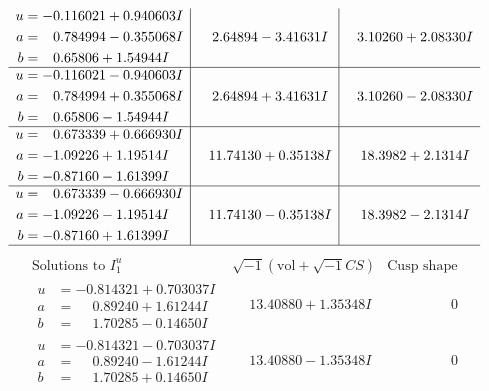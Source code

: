 \documentclass[1p]{elsarticle_modified}
\theoremstyle{definition}
\newcommand{\I}{\sqrt{-1}}
\begin{document}
$$\begin{array}{c|c|c}
\begin{aligned}
u &= -0.116021 + 0.940603 I \\
a &= \phantom{-}0.784994 - 0.355068 I \\
b &= \phantom{-}0.65806 + 1.54944 I\end{aligned}
 & \phantom{-}2.64894 - 3.41631 I & \phantom{-}3.10260 + 2.08330 I \\ \hline\begin{aligned}
u &= -0.116021 - 0.940603 I \\
a &= \phantom{-}0.784994 + 0.355068 I \\
b &= \phantom{-}0.65806 - 1.54944 I\end{aligned}
 & \phantom{-}2.64894 + 3.41631 I & \phantom{-}3.10260 - 2.08330 I \\ \hline\begin{aligned}
u &= \phantom{-}0.673339 + 0.666930 I \\
a &= -1.09226 + 1.19514 I \\
b &= -0.87160 - 1.61399 I\end{aligned}
 & \phantom{-}11.74130 + 0.35138 I & \phantom{-}18.3982 + 2.1314 I \\ \hline\begin{aligned}
u &= \phantom{-}0.673339 - 0.666930 I \\
a &= -1.09226 - 1.19514 I \\
b &= -0.87160 + 1.61399 I\end{aligned}
 & \phantom{-}11.74130 - 0.35138 I & \phantom{-}18.3982 - 2.1314 I\\
 \hline 
 \end{array}$$\newpage$$\begin{array}{c|c|c}  
\text{Solutions to }I^u_{1}& \I (\text{vol} + \sqrt{-1}CS) & \text{Cusp shape}\\
 \hline 
\begin{aligned}
u &= -0.814321 + 0.703037 I \\
a &= \phantom{-}0.89240 + 1.61244 I \\
b &= \phantom{-}1.70285 - 0.14650 I\end{aligned}
 & \phantom{-}13.40880 + 1.35348 I & \phantom{-0.000000 } 0 \\ \hline\begin{aligned}
u &= -0.814321 - 0.703037 I \\
a &= \phantom{-}0.89240 - 1.61244 I \\
b &= \phantom{-}1.70285 + 0.14650 I\end{aligned}
 & \phantom{-}13.40880 - 1.35348 I & \phantom{-0.000000 } 0 \\ \hline\begin{aligned}

\end{aligned}
\end{array}$$
\end{document}
